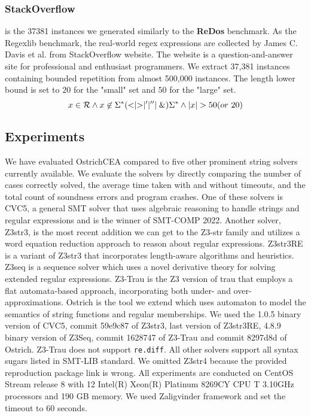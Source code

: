 {\subsubsection{StackOverflow} is the 37381 instances we generated similarly to the \textbf{ReDos} benchmark. As the Regexlib benchmark, the real-world regex expressions are collected by James C. Davis et al.\cite{regex_lingua_franca} from StackOverflow website\cite{stackoverflow}. The website is a question-and-answer site for professional and enthusiast programmers. We extract 37,381 instances containing bounded repetition from almost 500,000 instances. The length lower bound is set to $20$ for the "small" set and $50$ for the "large" set.
\begin{equation} \label{eq:template}
  x\in \mathcal{R} \wedge x\not\in \Sigma^*(<\mid >\mid '\mid ''\mid \&)\Sigma^*\wedge |x| > 50(or \ 20)
\end{equation}
}

\subsection{Experiments}

We have evaluated OstrichCEA compared to five other prominent string solvers currently available. We evaluate the solvers by directly comparing the number of cases correctly solved, the average time taken with and without timeouts, and the total count of soundness errors and program crashes. One of these solvers is CVC5\cite{cvc5}, a general SMT solver that uses algebraic reasoning to handle strings and regular expressions and is the winner of SMT-COMP 2022\cite{smt-comp}. Another solver, Z3str3\cite{z3str3}, is the most recent addition we can get to the Z3-str family and utilizes a word equation reduction approach to reason about regular expressions. Z3str3RE\cite{z3str3re} is a variant of Z3str3 that incorporates length-aware algorithms and heuristics. Z3seq\cite{z3seq} is a sequence solver which uses a novel derivative theory for solving extended regular expressions. Z3-Trau\cite{z3trau} is the Z3 version of trau\cite{trau} that employs a flat automata-based approach, incorporating both under- and over-approximations. Ostrich\cite{ostrich} is the tool we extend which uses automaton to model the semantics of string functions and regular memberships. We used the 1.0.5 binary version of CVC5, commit 59e9c87 of Z3str3, last version of Z3str3RE, 4.8.9 binary version of Z3Seq, commit 1628747 of Z3-Trau and commit 8297d8d of Ostrich. Z3-Trau does not support \verb|re.diff|. All other solvers support all syntax sugars listed in SMT-LIB standard\cite{smt_lib}. We omitted Z3str4\cite{z3str4} because the provided reproduction package link is wrong. All experiments are conducted on CentOS Stream release 8 with 12 Intel(R) Xeon(R) Platinum 8269CY CPU T 3.10GHz processors and 190 GB memory. We used Zaligvinder\cite{zaligvinder_2021} framework and set the timeout to 60 seconds. 


